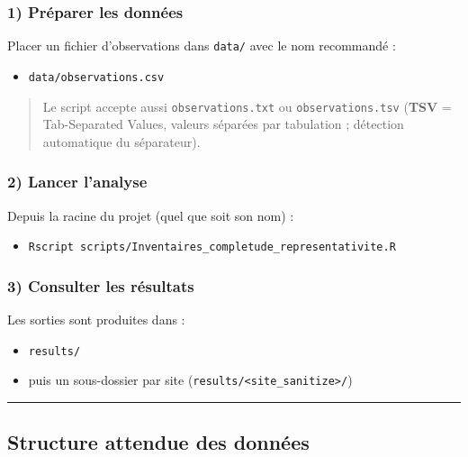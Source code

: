 \subsubsection{1) Préparer les
données}\label{pruxe9parer-les-donnuxe9es}

Placer un fichier d'observations dans \texttt{data/} avec le nom
recommandé :

\begin{itemize}
\tightlist
\item
  \texttt{data/observations.csv}
\end{itemize}

\begin{quote}
Le script accepte aussi \texttt{observations.txt} ou
\texttt{observations.tsv} (\textbf{TSV} = Tab-Separated Values, valeurs
séparées par tabulation ; détection automatique du séparateur).
\end{quote}

\subsubsection{2) Lancer l'analyse}\label{lancer-lanalyse}

Depuis la racine du projet (quel que soit son nom) :

\begin{itemize}
\tightlist
\item
  \texttt{Rscript\ scripts/Inventaires\_completude\_representativite.R}
\end{itemize}

\subsubsection{3) Consulter les
résultats}\label{consulter-les-ruxe9sultats}

Les sorties sont produites dans :

\begin{itemize}
\tightlist
\item
  \texttt{results/}
\item
  puis un sous-dossier par site
  (\texttt{results/\textless{}site\_sanitize\textgreater{}/})
\end{itemize}

\begin{center}\rule{0.5\linewidth}{0.5pt}\end{center}

\subsection{Structure attendue des
données}\label{structure-attendue-des-donnuxe9es}

